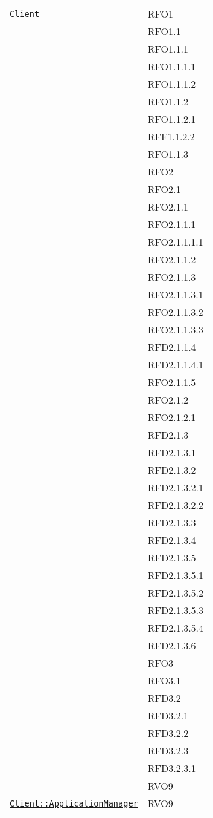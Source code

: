\begin{longtable}{|>{\centering}m{10cm}|m{3cm}<{\centering}|}
\hyperref[Client]{\texttt{Client}} & RFO1\\
& RFO1.1\\
& RFO1.1.1\\
& RFO1.1.1.1\\
& RFO1.1.1.2\\
& RFO1.1.2\\
& RFO1.1.2.1\\
& RFF1.1.2.2\\
& RFO1.1.3\\
& RFO2\\
& RFO2.1\\
& RFO2.1.1\\
& RFO2.1.1.1\\
& RFO2.1.1.1.1\\
& RFO2.1.1.2\\
& RFO2.1.1.3\\
& RFO2.1.1.3.1\\
& RFO2.1.1.3.2\\
& RFO2.1.1.3.3\\
& RFD2.1.1.4\\
& RFD2.1.1.4.1\\
& RFO2.1.1.5\\
& RFO2.1.2\\
& RFO2.1.2.1\\
& RFD2.1.3\\
& RFD2.1.3.1\\
& RFD2.1.3.2\\
& RFD2.1.3.2.1\\
& RFD2.1.3.2.2\\
& RFD2.1.3.3\\
& RFD2.1.3.4\\
& RFD2.1.3.5\\
& RFD2.1.3.5.1\\
& RFD2.1.3.5.2\\
& RFD2.1.3.5.3\\
& RFD2.1.3.5.4\\
& RFD2.1.3.6\\
& RFO3\\
& RFO3.1\\
& RFD3.2\\
& RFD3.2.1\\
& RFD3.2.2\\
& RFD3.2.3\\
& RFD3.2.3.1\\
& RVO9\\ \hline

\hyperref[Client::ApplicationManager]{\texttt{Client::ApplicationManager}} & RVO9\\ \hline


\end{longtable}
